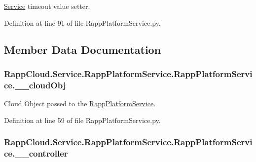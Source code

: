 \hyperlink{namespaceRappCloud_1_1Service}{Service} timeout value setter. 



Definition at line 91 of file Rapp\-Platform\-Service.\-py.



\subsection{Member Data Documentation}
\hypertarget{classRappCloud_1_1Service_1_1RappPlatformService_1_1RappPlatformService_a07ec5ec510ba7ce5d826e31d87425d36}{
\subsubsection[{\-\_\-\-\_\-cloud\-Obj}]{\setlength{\rightskip}{0pt plus 5cm}Rapp\-Cloud.\-Service.\-Rapp\-Platform\-Service.\-Rapp\-Platform\-Service.\-\_\-\-\_\-cloud\-Obj\hspace{0.3cm}{\ttfamily [private]}}}\label{classRappCloud_1_1Service_1_1RappPlatformService_1_1RappPlatformService_a07ec5ec510ba7ce5d826e31d87425d36}


Cloud Object passed to the \hyperlink{classRappCloud_1_1Service_1_1RappPlatformService_1_1RappPlatformService}{Rapp\-Platform\-Service}. 



Definition at line 59 of file Rapp\-Platform\-Service.\-py.

\hypertarget{classRappCloud_1_1Service_1_1RappPlatformService_1_1RappPlatformService_ac53cac24fe1b9739f4dc7d563892122a}{
\subsubsection[{\-\_\-\-\_\-controller}]{\setlength{\rightskip}{0pt plus 5cm}Rapp\-Cloud.\-Service.\-Rapp\-Platform\-Service.\-Rapp\-Platform\-Service.\-\_\-\-\_\-controller\hspace{0.3cm}{\ttfamily [private]}}}\label{classRappCloud_1_1Service_1_1RappPlatformService_1_1RappPlatformService_ac53cac24fe1b9739f4dc7d563892122a}


